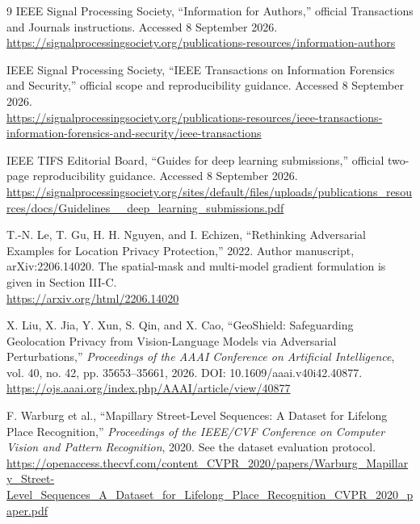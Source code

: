 \documentclass[11pt,a4paper]{article}
\begin{document}
\begin{thebibliography}{9}
IEEE Signal Processing Society, ``Information for Authors,'' official Transactions and Journals instructions. Accessed 8 September 2026.\\
\url{https://signalprocessingsociety.org/publications-resources/information-authors}

IEEE Signal Processing Society, ``IEEE Transactions on Information Forensics and Security,'' official scope and reproducibility guidance. Accessed 8 September 2026.\\
\url{https://signalprocessingsociety.org/publications-resources/ieee-transactions-information-forensics-and-security/ieee-transactions}

IEEE TIFS Editorial Board, ``Guides for deep learning submissions,'' official two-page reproducibility guidance. Accessed 8 September 2026.\\
\url{https://signalprocessingsociety.org/sites/default/files/uploads/publications_resources/docs/Guidelines__deep_learning_submissions.pdf}

T.-N. Le, T. Gu, H. H. Nguyen, and I. Echizen, ``Rethinking Adversarial Examples for Location Privacy Protection,'' 2022. Author manuscript, arXiv:2206.14020. The spatial-mask and multi-model gradient formulation is given in Section III-C.\\
\url{https://arxiv.org/html/2206.14020}

X. Liu, X. Jia, Y. Xun, S. Qin, and X. Cao, ``GeoShield: Safeguarding Geolocation Privacy from Vision-Language Models via Adversarial Perturbations,'' \emph{Proceedings of the AAAI Conference on Artificial Intelligence}, vol. 40, no. 42, pp. 35653--35661, 2026. DOI: 10.1609/aaai.v40i42.40877.\\
\url{https://ojs.aaai.org/index.php/AAAI/article/view/40877}

F. Warburg et al., ``Mapillary Street-Level Sequences: A Dataset for Lifelong Place Recognition,'' \emph{Proceedings of the IEEE/CVF Conference on Computer Vision and Pattern Recognition}, 2020. See the dataset evaluation protocol.\\
\url{https://openaccess.thecvf.com/content_CVPR_2020/papers/Warburg_Mapillary_Street-Level_Sequences_A_Dataset_for_Lifelong_Place_Recognition_CVPR_2020_paper.pdf}
\end{thebibliography}
\end{document}
